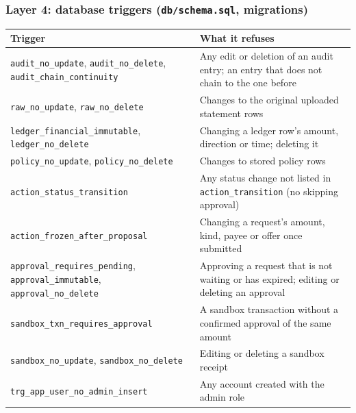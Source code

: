 \documentclass[10pt,a4paper]{article}
\newcommand{\code}[1]{\texttt{\small #1}}
\begin{document}
\subsubsection{Layer 4: database triggers (\code{db/schema.sql}, migrations)}
\begin{center}
\begin{tabularx}{\textwidth}{@{}L{5.2cm}Y@{}}
\toprule
\textbf{Trigger} & \textbf{What it refuses}\\
\midrule
\code{audit\_no\_update}, \code{audit\_no\_delete}, \code{audit\_chain\_continuity} & Any edit or deletion of an audit entry; an entry that does not chain to the one before\\
\code{raw\_no\_update}, \code{raw\_no\_delete} & Changes to the original uploaded statement rows\\
\code{ledger\_financial\_immutable}, \code{ledger\_no\_delete} & Changing a ledger row's amount, direction or time; deleting it\\
\code{policy\_no\_update}, \code{policy\_no\_delete} & Changes to stored policy rows\\
\code{action\_status\_transition} & Any status change not listed in \code{action\_transition} (no skipping approval)\\
\code{action\_frozen\_after\_proposal} & Changing a request's amount, kind, payee or offer once submitted\\
\code{approval\_requires\_pending}, \code{approval\_immutable}, \code{approval\_no\_delete} & Approving a request that is not waiting or has expired; editing or deleting an approval\\
\code{sandbox\_txn\_requires\_approval} & A sandbox transaction without a confirmed approval of the same amount\\
\code{sandbox\_no\_update}, \code{sandbox\_no\_delete} & Editing or deleting a sandbox receipt\\
\code{trg\_app\_user\_no\_admin\_insert} & Any account created with the admin role\\
\bottomrule
\end{tabularx}
\end{center}
\end{document}
